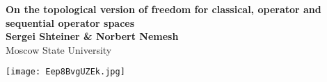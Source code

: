 \documentclass[a0b,landscape]{a0poster}
\begin{document}

%
% 

\begin{minipage}[b]{0.85\linewidth}
\veryHuge{} \color{NavyBlue} \textbf{
    On the topological version of freedom for classical, 
    operator and sequential operator spaces} \color{Black}\\ %
\Large\textbf{Sergei Shteiner \& Norbert Nemesh}\\ %
\Large Moscow State University\\ %
\end{minipage}
%
%
\begin{minipage}[b]{0.15\linewidth}
\begin{center}
\texttt{[image: Eep8BvgUZEk.jpg]} 
\end{center}
\end{minipage}


\end{document}
